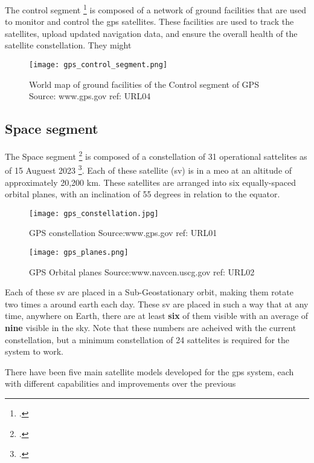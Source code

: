 The control segment \footcite{noauthor_gpsgov_nodate} is composed of a network of ground facilities that are used to monitor and control the \gls{gps} satellites. These facilities are used to track the satellites, upload updated navigation data, and ensure the overall health of the satellite constellation. They might

\begin{figure}[H]
	\centering
	\texttt{[image: gps\_control\_segment.png]}
	\caption[GPS Control segment]{World map of ground facilities of the Control segment of GPS Source: www.gps.gov ref: URL04}
	\label{fig:gps_control_segment}
\end{figure}

\subsection{Space segment}

The Space segment \footcite{noauthor_gpsgov_nodate} is composed of a constellation of 31 operational sattelites as of 15 Auguest 2023 \footcite{noauthor_list_2024}. Each of these satellite (\gls{sv}) is in a \gls{meo} at an altitude of approximately 20,200 km. These satellites are arranged into six equally-spaced orbital planes, with an inclination of 55 degrees in relation to the equator.

\begin{figure}[H]
	\centering
	\texttt{[image: gps\_constellation.jpg]}
	\caption[GPS Satellite constellation]{GPS constellation Source:www.gps.gov ref: URL01}
	\label{fig:gps_constellation}
\end{figure}

\begin{figure}[H]
	\centering
	\texttt{[image: gps\_planes.png]}
	\caption[GPS Orbital planes]{GPS Orbital planes Source:www.navcen.uscg.gov ref: URL02}
	\label{fig:gps_planes}
\end{figure}

Each of these \gls{sv} are placed in a Sub-Geostationary orbit, making them rotate two times a around earth each day. These \gls{sv} are placed in such a way that at any time, anywhere on Earth, there are at least \textbf{six} of them visible with an average of \textbf{nine} visible in the sky. Note that these numbers are acheived with the current constellation, but a minimum constellation of 24 sattelites is required for the system to work.

There have been five main satellite models developed for the \gls{gps} system, each with different capabilities and improvements over the previous


